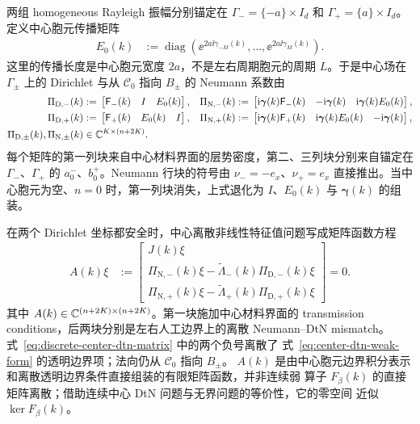 两组 homogeneous Rayleigh 振幅分别锚定在
$\Gamma_- = \{-a\}\times I_d$ 和 $\Gamma_+ = \{a\}\times I_d$。定义中心胞元传播矩阵
\begin{align}
  E_0(k)
  &:=\operatorname{diag}\left(
    \ee^{2a\ii\gamma_{-M}(k)},\ldots,
    \ee^{2a\ii\gamma_M(k)}
  \right).
  \label{eq:center-cell-propagation-matrix}
\end{align}
这里的传播长度是中心胞元宽度 $2a$，不是左右周期胞元的周期 $L$。于是中心场在
$\Gamma_\pm$ 上的 Dirichlet 与从 $\mathcal C_0$ 指向 $B_\pm$ 的 Neumann 系数由
\begin{align}
  \Pi_{\mathrm D,-}(k)
  &:={}
  \begin{bmatrix}
    \mathsf F_-(k)&I&E_0(k)
  \end{bmatrix},
  &
  \Pi_{\mathrm N,-}(k)
  &:={}
  \begin{bmatrix}
    \mathrm{i}\boldsymbol{\gamma}(k)\mathsf F_-(k)
    &-\mathrm{i}\boldsymbol{\gamma}(k)
    &\mathrm{i}\boldsymbol{\gamma}(k)E_0(k)
  \end{bmatrix},
  \notag\\
  \Pi_{\mathrm D,+}(k)
  &:={}
  \begin{bmatrix}
    \mathsf F_+(k)&E_0(k)&I
  \end{bmatrix},
  &
  \Pi_{\mathrm N,+}(k)
  &:={}
  \begin{bmatrix}
    \mathrm{i}\boldsymbol{\gamma}(k)\mathsf F_+(k)
    &\mathrm{i}\boldsymbol{\gamma}(k)E_0(k)
    &-\mathrm{i}\boldsymbol{\gamma}(k)
  \end{bmatrix},
  \label{eq:center-trace-extraction-matrices}\\
  \Pi_{\mathrm D,\pm}(k),
  \Pi_{\mathrm N,\pm}(k)
  &\in\mathbb{C}^{K\times(n+2K)}.
  \notag
\end{align}
每个矩阵的第一列块来自中心材料界面的层势密度，第二、三列块分别来自锚定在
$\Gamma_-$、$\Gamma_+$ 的 $a_0^-$、$b_0^+$。Neumann 行块的符号由
$\nu_-=-e_x$、$\nu_+=e_x$ 直接推出。当中心胞元为空、$n=0$ 时，第一列块消失，上式退化为
$I$、$E_0(k)$ 与 $\boldsymbol{\gamma}(k)$ 的组装。

在两个 Dirichlet 坐标都安全时，中心离散非线性特征值问题写成矩阵函数方程
\begin{align}
  A(k)\xi
  &:={}
  \begin{bmatrix}
    J(k)\xi\\
    \Pi_{\mathrm N,-}(k)\xi
      -\widetilde{\Lambda}_-(k)\Pi_{\mathrm D,-}(k)\xi\\
    \Pi_{\mathrm N,+}(k)\xi
      -\widetilde{\Lambda}_+(k)\Pi_{\mathrm D,+}(k)\xi
  \end{bmatrix}
  =0.
  \label{eq:discrete-center-dtn-matrix}
\end{align}
其中 $A(k)\in\mathbb{C}^{(n+2K)\times(n+2K)}$。第一块施加中心材料界面的
transmission conditions，后两块分别是左右人工边界上的离散 Neumann--DtN mismatch。
式~\eqref{eq:discrete-center-dtn-matrix} 中的两个负号离散了
式~\eqref{eq:center-dtn-weak-form} 的透明边界项；法向仍从 $\mathcal C_0$ 指向 $B_\pm$。
$A(k)$ 是由中心胞元边界积分表示和离散透明边界条件直接组装的有限矩阵函数，并非连续弱
算子 $F_\beta(k)$ 的直接矩阵离散；借助连续中心 DtN 问题与无界问题的等价性，它的零空间
近似 $\ker F_\beta(k)$。

